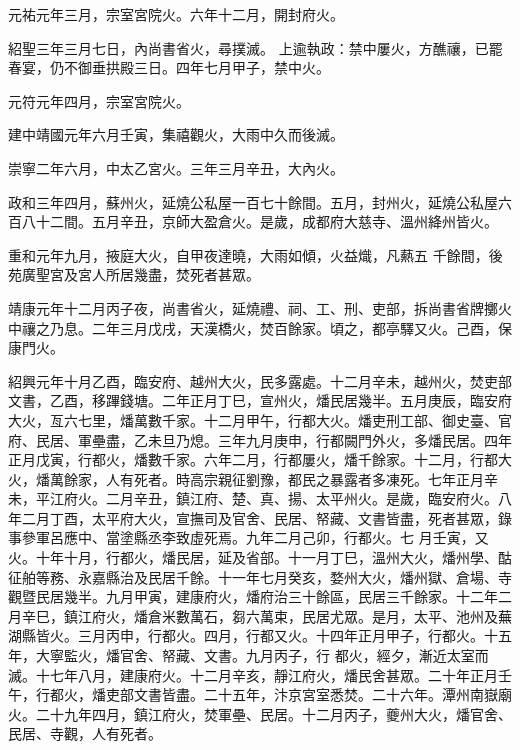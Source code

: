\begin{pinyinscope}
 元祐元年三月，宗室宮院火。六年十二月，開封府火。



 紹聖三年三月七日，內尚書省火，尋撲滅。
 上逾執政：禁中屢火，方醮禳，已罷春宴，仍不御垂拱殿三日。四年七月甲子，禁中火。



 元符元年四月，宗室宮院火。



 建中靖國元年六月壬寅，集禧觀火，大雨中久而後滅。



 崇寧二年六月，中太乙宮火。三年三月辛丑，大內火。



 政和三年四月，蘇州火，延燒公私屋一百七十餘間。五月，封州火，延燒公私屋六百八十二間。五月辛丑，京師大盈倉火。是歲，成都府大慈寺、溫州絳州皆火。



 重和元年九月，掖庭大火，自甲夜達曉，大雨如傾，火益熾，凡爇五
 千餘間，後苑廣聖宮及宮人所居幾盡，焚死者甚眾。



 靖康元年十二月丙子夜，尚書省火，延燒禮、祠、工、刑、吏部，拆尚書省牌擲火中禳之乃息。二年三月戊戌，天漢橋火，焚百餘家。頃之，都亭驛又火。己酉，保康門火。



 紹興元年十月乙酉，臨安府、越州大火，民多露處。十二月辛未，越州火，焚吏部文書，乙酉，移蹕錢塘。二年正月丁巳，宣州火，燔民居幾半。五月庚辰，臨安府大火，亙六七里，燔萬數千家。十二月甲午，行都大火。燔吏刑工部、御史臺、官
 府、民居、軍壘盡，乙未旦乃熄。三年九月庚申，行都闕門外火，多燔民居。四年正月戊寅，行都火，燔數千家。六年二月，行都屢火，燔千餘家。十二月，行都大火，燔萬餘家，人有死者。時高宗親征劉豫，都民之暴露者多凍死。七年正月辛未，平江府火。二月辛丑，鎮江府、楚、真、揚、太平州火。是歲，臨安府火。八年二月丁酉，太平府大火，宣撫司及官舍、民居、帑藏、文書皆盡，死者甚眾，錄事參軍呂應中、當塗縣丞李致虛死焉。九年二月己卯，行都火。七
 月壬寅，又火。十年十月，行都火，燔民居，延及省部。十一月丁巳，溫州大火，燔州學、酤征舶等務、永嘉縣治及民居千餘。十一年七月癸亥，婺州大火，燔州獄、倉場、寺觀暨民居幾半。九月甲寅，建康府火，燔府治三十餘區，民居三千餘家。十二年二月辛巳，鎮江府火，燔倉米數萬石，芻六萬束，民居尤眾。是月，太平、池州及蕪湖縣皆火。三月丙申，行都火。四月，行都又火。十四年正月甲子，行都火。十五年，大寧監火，燔官舍、帑藏、文書。九月丙子，行
 都火，經夕，漸近太室而滅。十七年八月，建康府火。十二月辛亥，靜江府火，燔民舍甚眾。二十年正月壬午，行都火，燔吏部文書皆盡。二十五年，汴京宮室悉焚。二十六年。潭州南嶽廟火。二十九年四月，鎮江府火，焚軍壘、民居。十二月丙子，夔州大火，燔官舍、民居、寺觀，人有死者。




\end{pinyinscope}
